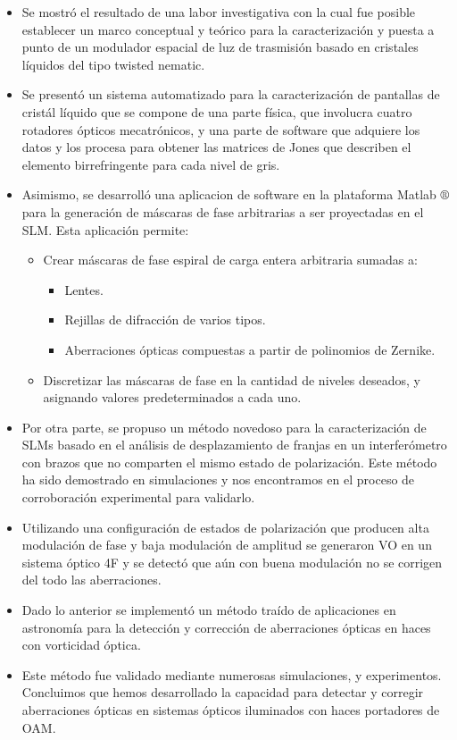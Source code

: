 \begin{itemize}
\item Se mostró el resultado de una labor investigativa con la cual
  fue posible establecer un marco conceptual y teórico para la
  caracterización y puesta a punto de un modulador espacial de luz de
  trasmisión basado en cristales líquidos del tipo twisted nematic. 
\item Se presentó un sistema automatizado para la caracterización de
  pantallas de cristál líquido que se compone de una parte física, que
  involucra cuatro rotadores ópticos mecatrónicos, y una parte de
  software que adquiere los datos y los procesa para obtener las
  matrices de Jones que describen el elemento birrefringente para cada
  nivel de gris. 
\item Asimismo, se desarrolló una aplicacion de software en la
  plataforma Matlab $\circledR$ para la
  generación de máscaras de fase arbitrarias a ser proyectadas en el
  SLM. Esta aplicación permite:
  \begin{itemize}
    \item Crear máscaras de fase espiral de carga entera arbitraria
      sumadas a:
      \begin{itemize}
        \item Lentes.
        \item Rejillas de difracción de varios tipos.
        \item Aberraciones ópticas compuestas a partir de polinomios
          de Zernike.
      \end{itemize}
    \item Discretizar las máscaras de fase en la cantidad de niveles
      deseados, y asignando valores predeterminados a cada uno. 
  \end{itemize}
\item Por otra parte, se propuso un método novedoso para la
  caracterización de SLMs basado en el análisis de desplazamiento de
  franjas en un interferómetro con brazos que no comparten el mismo
  estado de polarización. Este método ha sido demostrado en
  simulaciones y nos encontramos en el proceso de corroboración
  experimental para validarlo. 
 \item Utilizando una configuración de estados de polarización que
   producen alta modulación de fase y baja modulación de amplitud se
   generaron VO en un sistema óptico 4F y se detectó que aún con buena
   modulación no se corrigen del todo las aberraciones. 
\item Dado lo anterior se implementó un método traído de aplicaciones
  en astronomía para la detección y
  corrección de aberraciones ópticas en haces con vorticidad óptica.
\item Este método fue validado mediante numerosas simulaciones, y
  experimentos. Concluimos que hemos desarrollado la capacidad para
  detectar y corregir aberraciones ópticas en sistemas ópticos
  iluminados con haces portadores de OAM.
\end{itemize}




